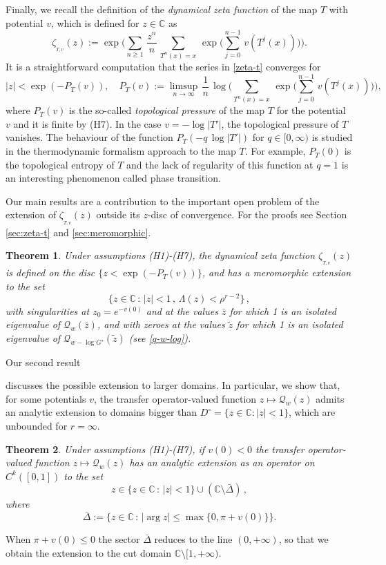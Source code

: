 \documentclass[11pt]{amsart}
\newtheorem{theorem}{Theorem}[section]
\theoremstyle{definition}
\theoremstyle{remark}
\theoremstyle{definition}
\numberwithin{equation}{section}
\newcommand{\C}{\mathbb C}
\newcommand{\QQ}{\mathcal{Q}}
\newcommand{\dynzeta}[1]{\zeta_{_{#1}}}
\begin{document}
Finally,  we recall the definition of the \emph{dynamical zeta function} of the map $T$ with potential $v$, which is defined for $z\in \C$ as
\begin{equation}\label{zeta-t}
\dynzeta{T,v}(z) := \exp \Big( \sum_{n\ge 1}\, \frac{z^n}n\, \sum_{T^n(x)=x}\, \exp\Big(\sum_{j=0}^{n-1}\, v(T^j(x))\Big) \Big).
\end{equation}
It is a straightforward computation that the series in \eqref{zeta-t} converges for 
\[
|z| < \exp(-P_T(v)), \quad P_T(v):= \limsup_{n\to \infty}\, \frac 1n\, \log \Big( \sum_{T^n(x)=x}\, \exp\Big(\sum_{j=0}^{n-1}\, v(T^j(x))\Big) \Big),
\]
where $P_T(v)$ is the so-called \emph{topological pressure} of the map $T$ for the potential $v$ and it is finite by (H7). In the case $v=-\log |T'|$, the topological pressure of $T$ vanishes. The behaviour of the function $P_T(-q\, \log |T'|)$ for $q\in [0,\infty)$ is studied in the thermodynamic formalism approach to the map $T$. For example, $P_T(0)$ is the topological entropy of $T$ and the lack of regularity of this function at $q=1$ is an interesting phenomenon called phase transition.

Our main results are a contribution to the important open problem of the extension of $\dynzeta{T,v}(z)$ outside its $z$-disc of convergence. For the proofs see Section \ref{sec:zeta-t} and \ref{sec:meromorphic}.

\begin{theorem}\label{thm:zeta-final-1}
Under assumptions (H1)-(H7), the dynamical zeta function $\dynzeta{T,v}(z)$ is defined on the disc $\{z < \exp(-P_T(v))\}$, {and has a meromorphic extension to the set
\[
\{z\in \C\, :\, |z|<1\, ,\, \Lambda(z)<\rho^{r-2}\}\, ,
\]  
}with singularities at $z_0 = e^{-v(0)}$ and at the values $\bar z$ for which 1 is an isolated eigenvalue of $\QQ_w(\bar z)$, and with zeroes at the values $\tilde z$ for which 1 is an isolated eigenvalue of $\QQ_{w-\log G'}(\tilde z)$ (see \eqref{q-w-log}).
\end{theorem}


Our second result {discusses the possible extension to larger domains. In particular, we show that, for some potentials $v$, the transfer operator-valued function $z\mapsto \QQ_w(z)$ admits an analytic extension to domains bigger than $D^\circ =\{z\in \C: |z|<1\}$, which are unbounded for $r=\infty$.

\begin{theorem}\label{teo:cont-v0}
Under assumptions (H1)-(H7), if $v(0)<0$ the transfer operator-valued function $z\mapsto \QQ_w(z)$ has an analytic extension as an operator on $C^k([0,1])$ to the set 
\[
z\in \{z\in \C\, :\, |z|< 1\} \cup (\C\setminus \bar{\Delta})\, ,
\] 
where
\[
\bar{\Delta}:= \{z\in \C\, :\, |\arg z| \le \max\{0,\pi+v(0)\} \}.
\]
\end{theorem}
When $\pi+v(0)\le 0$ the sector $\bar{\Delta}$ reduces to the line $(0,+\infty)$, so that we obtain the extension to the cut domain $\C\setminus [1,+\infty)$.}
\end{document}
